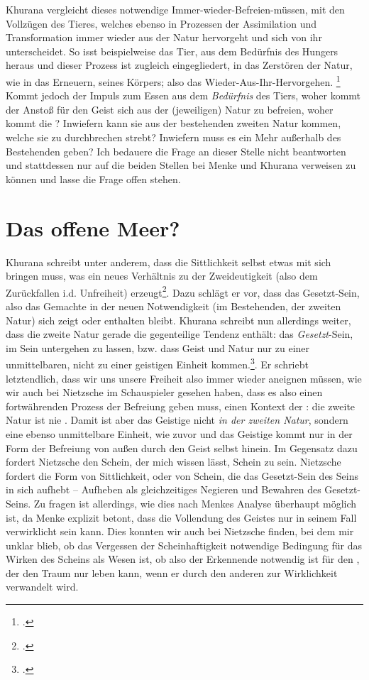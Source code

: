 \documentclass[12pt, a4paper, openany]{report}
\begin{document}
Khurana vergleicht dieses notwendige Immer-wieder-Befreien-müssen, mit den Vollzügen des Tieres, welches ebenso in Prozessen der Assimilation und Transformation immer wieder aus der Natur hervorgeht und sich von ihr unterscheidet.
So isst beispielweise das Tier, aus dem Bedürfnis des Hungers heraus und dieser Prozess ist zugleich eingegliedert, in das Zerstören der Natur, wie in das Erneuern, seines Körpers; also das Wieder-Aus-Ihr-Hervorgehen. \footcite[Vgl.][S.???]{khurana_freiheit_2017}
Kommt jedoch der Impuls zum Essen aus dem \emph{Bedürfnis} des Tiers, woher kommt der Anstoß für den Geist sich aus der (jeweiligen) Natur zu befreien, woher kommt die ?
Inwiefern kann sie aus der bestehenden zweiten Natur kommen, welche sie zu durchbrechen strebt? 
Inwiefern muss es ein Mehr außerhalb des Bestehenden geben?
Ich bedauere die Frage an dieser Stelle nicht beantworten und stattdessen nur auf die beiden Stellen bei Menke und Khurana verweisen zu können und lasse die Frage offen stehen.

\section{Das offene Meer?}\label{abschnitt_4}
Khurana schreibt unter anderem, dass die Sittlichkeit selbst etwas mit sich bringen muss, was ein neues Verhältnis zu der Zweideutigkeit (also dem Zurückfallen i.d. Unfreiheit) erzeugt\footcite[Vgl.][399]{khurana_freiheit_2017}.
Dazu schlägt er vor, dass das Gesetzt-Sein, also das Gemachte in der neuen Notwendigkeit (im Bestehenden, der zweiten Natur) sich zeigt oder enthalten bleibt. 
Khurana schreibt nun allerdings weiter, dass die zweite Natur gerade die gegenteilige Tendenz enthält: 
das \emph{Gesetzt}-Sein, im Sein untergehen zu lassen, bzw. dass Geist und Natur nur zu einer unmittelbaren, nicht zu einer geistigen Einheit kommen.\footcite[Vgl.][401]{khurana_freiheit_2017}.
Er schriebt letztendlich, dass wir uns unsere Freiheit also immer wieder aneignen müssen, wie wir auch bei Nietzsche im Schauspieler gesehen haben, dass es also einen fortwährenden Prozess der Befreiung geben muss, einen Kontext der : 
die zweite Natur ist nie .
Damit ist aber das Geistige nicht \emph{in der zweiten Natur}, sondern eine ebenso unmittelbare Einheit, wie zuvor und das Geistige kommt nur in der Form der Befreiung von außen durch den Geist selbst hinein. 
Im Gegensatz dazu fordert Nietzsche den Schein, der mich wissen lässt, Schein zu sein.
Nietzsche fordert die Form von Sittlichkeit, oder von Schein, die das Gesetzt-Sein des Seins in sich aufhebt -- Aufheben als gleichzeitiges Negieren und Bewahren des Gesetzt-Seins.
Zu fragen ist allerdings, wie dies nach Menkes Analyse überhaupt möglich ist, da Menke explizit betont, dass die Vollendung des Geistes nur in seinem Fall verwirklicht sein kann.
Dies konnten wir auch bei Nietzsche finden, bei dem mir unklar blieb, ob das Vergessen der Scheinhaftigkeit notwendige Bedingung für das Wirken des Scheins als Wesen ist, ob also der Erkennende notwendig ist für den , der den Traum nur leben kann, wenn er durch den anderen zur Wirklichkeit verwandelt wird.\\
\end{document}
